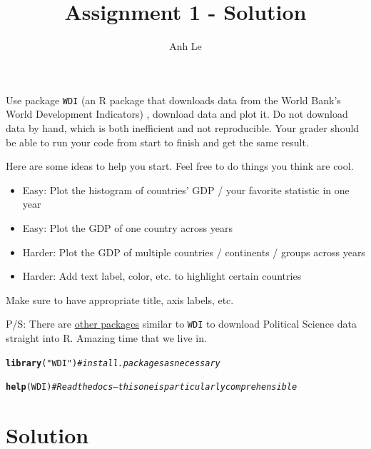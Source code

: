 \documentclass{article}\usepackage[]{graphicx}\usepackage[]{color}
\title{Assignment 1 - Solution}
\author{Anh Le}
\makeatletter
\newcommand{\hlstr}[1]{\textcolor[rgb]{0.192,0.494,0.8}{#1}}%
\newcommand{\hlcom}[1]{\textcolor[rgb]{0.678,0.584,0.686}{\textit{#1}}}%
\newcommand{\hlstd}[1]{\textcolor[rgb]{0.345,0.345,0.345}{#1}}%
\newcommand{\hlkwd}[1]{\textcolor[rgb]{0.737,0.353,0.396}{\textbf{#1}}}%
\newenvironment{kframe}{%
 \def\at@end@of@kframe{}%
 \ifinner\ifhmode%
  \def\at@end@of@kframe{\end{minipage}}%
  \begin{minipage}{\columnwidth}%
 \fi\fi%
 \def\FrameCommand##1{\hskip\@totalleftmargin \hskip-\fboxsep
 \colorbox{shadecolor}{##1}\hskip-\fboxsep
     \hskip-\linewidth \hskip-\@totalleftmargin \hskip\columnwidth}%
 \MakeFramed {\advance\hsize-\width
   \@totalleftmargin\z@ \linewidth\hsize
   \@setminipage}}%
 {\par\unskip\endMakeFramed%
 \at@end@of@kframe}
\newenvironment{knitrout}{}{} %
\makeatother
\begin{document}
\maketitle

Use package \verb`WDI` (an R package that downloads data from the World Bank's World Development Indicators) , download data and plot it. Do not download data by hand, which is both inefficient and not reproducible. Your grader should be able to run your code from start to finish and get the same result.

Here are some ideas to help you start. Feel free to do things you think are cool.
\begin{itemize}
\item Easy: Plot the histogram of countries' GDP / your favorite statistic in one year
\item Easy: Plot the GDP of one country across years
\item Harder: Plot the GDP of multiple countries / continents / groups across years
\item Harder: Add text label, color, etc. to highlight certain countries
\end{itemize}

Make sure to have appropriate title, axis labels, etc.

P/S: There are \href{http://github.com/rOpenGov/psData}{other packages} similar to \verb`WDI` to download Political Science data straight into R. Amazing time that we live in.

\begin{knitrout}
\color{fgcolor}\begin{kframe}
\begin{alltt}
\hlkwd{library}\hlstd{(}\hlstr{"WDI"}\hlstd{)} \hlcom{# install.packages as necessary}
\end{alltt}


{\ttfamily\noindent\itshape\color{messagecolor}{\#\# Loading required package: RJSONIO}}\begin{alltt}
\hlkwd{help}\hlstd{(WDI)} \hlcom{# Read the docs -- this one is particularly comprehensible}
\end{alltt}
\end{kframe}
\end{knitrout}

\section{Solution}
\end{document}
